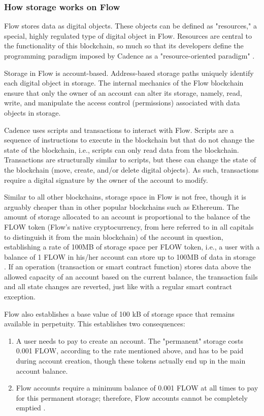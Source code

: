 \documentclass[./4_GeneralApproach.tex]{subfiles}
\begin{document}
\subsubsection{How storage works on Flow}
Flow stores data as digital objects. These objects can be defined as "resources," a special, highly regulated type of digital object in Flow. Resources are central to the functionality of this blockchain, so much so that its developers define the programming paradigm imposed by Cadence as a "resource-oriented paradigm" \cite{flow2024}.
\par
Storage in Flow is account-based. Address-based storage paths uniquely identify each digital object in storage. The internal mechanics of the Flow blockchain ensure that only the owner of an account can alter its storage, namely, read, write, and manipulate the access control (permissions) associated with data objects in storage.
\par
Cadence uses scripts and transactions to interact with Flow. Scripts are a sequence of instructions to execute in the blockchain but that do not change the state of the blockchain, i.e., scripts can only read data from the blockchain. Transactions are structurally similar to scripts, but these can change the state of the blockchain (move, create, and/or delete digital objects). As such, transactions require a digital signature by the owner of the account to modify.
\par
Similar to all other blockchains, storage space in Flow is not free, though it is arguably cheaper than in other popular blockchains such as Ethereum. The amount of storage allocated to an account is proportional to the balance of the FLOW token (Flow's native cryptocurrency, from here referred to in all capitals to distinguish it from the main blockchain) of the account in question, establishing a rate of 100MB of storage space per FLOW token, i.e., a user with a balance of 1 FLOW in his/her account can store up to 100MB of data in storage \cite{flow2024}. If an operation (transaction or smart contract function) stores data above the allowed capacity of an account based on the current balance, the transaction fails and all state changes are reverted, just like with a regular smart contract exception.
\par
Flow also establishes a base value of 100 kB of storage space that remains available in perpetuity. This establishes two consequences:

\begin{enumerate}
    \item {A user needs to pay to create an account. The "permanent" storage costs 0.001 FLOW, according to the rate mentioned above, and has to be paid during account creation, though these tokens actually end up in the main account balance.}
    \item {Flow accounts require a minimum balance of 0.001 FLOW at all times to pay for this permanent storage; therefore, Flow accounts cannot be completely emptied \cite{flow2024}.}
\end{enumerate}
\end{document}
